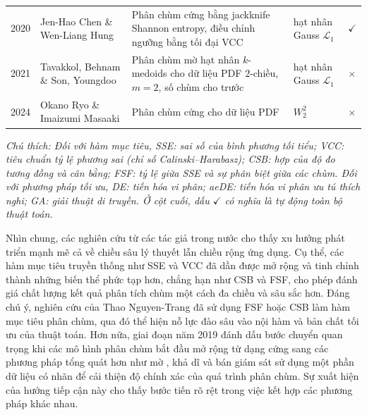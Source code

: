 \documentclass[a4paper,oneside]{book} %
\theoremstyle{plain}
\theoremstyle{plain}
\theoremstyle{nonumberplain}
\begin{document}
\begin{table}
\begin{tabular*}{\textwidth}{@{\extracolsep\fill}lp{3cm}p{5.5cm}p{3cm}p{2cm}@{\extracolsep\fill}}
		\midrule
				2020 & Jen-Hao Chen \& Wen-Liang Hung \cite{chen2021jackknife} & Phân chùm cứng bằng jackknife Shannon entropy, điều chỉnh ngưỡng bằng tối đại VCC& hạt nhân Gauss $\mathcal{L}_1$ & $\checkmark$\\
		2021 & Tavakkol, Behnam \& Son, Youngdoo \cite{tavakkol2021fuzzy} & Phân chùm mờ hạt nhân $k$-medoids cho dữ liệu PDF $2$-chiều, $m=2$, số chùm cho trước& hạt nhân Gauss $\mathcal{L}_1$& $\times$   \\
		2024 & Okano Ryo \& Imaizumi Masaaki \cite{okano2024wasserstein} & Phân chùm cứng cho dữ liệu PDF &$W^2_2$ &$\times$   \\
		\bottomrule
	\end{tabular*}
	\label{tab:in_clustering_summary}
\begin{minipage}{\textwidth}
			\fontsize{11pt}{14pt}\selectfont\it
	Chú thích:	Đối với hàm mục tiêu, SSE: sai số của bình phương tối tiểu; VCC: tiêu chuẩn tỷ lệ phương sai (chỉ số Calinski--Harabasz); CSB: hợp của độ đo tương đồng và cân bằng; FSF: tỷ lệ giữa SSE và sự phân biệt giữa các chùm. Đối với phương pháp tối ưu, DE:  tiến hóa vi phân; aeDE: tiến hóa vi phân ưu tú thích nghi; GA: giải thuật di truyền. Ở cột cuối, dấu $\checkmark$ có nghĩa là tự động toàn bộ thuật toán.
\end{minipage}
\end{table}

Nhìn chung, các nghiên cứu từ các tác giả trong nước cho thấy xu hướng phát triển mạnh mẽ cả về chiều sâu lý thuyết lẫn chiều rộng ứng dụng. Cụ thể, các hàm mục tiêu truyền thống như SSE và VCC đã dần được mở rộng và tinh chỉnh thành những biến thể phức tạp hơn, chẳng hạn như CSB và FSF, cho phép đánh giá chất lượng kết quả phân tích chùm một cách đa chiều và sâu sắc hơn. Đáng chú ý, nghiên cứu của Thao Nguyen-Trang đã sử dụng FSF \cite{nguyen2023globally} hoặc CSB \cite{nguyen2023balance} làm hàm mục tiêu phân chùm, qua đó thể hiện nỗ lực đào sâu vào nội hàm và bản chất tối ưu của thuật toán.
Hơn nữa, giai đoạn năm 2019 đánh dấu bước chuyển quan trọng khi các mô hình phân chùm bắt đầu mở rộng từ dạng cứng \cite{pham2019new} sang các phương pháp tổng quát hơn như mờ \cite{phamtoan2022automatic}, khả dĩ \cite{tran2024new} và bán giám sát \cite{nguyen2024new} sử dụng một phần dữ liệu có nhãn để cải thiện độ chính xác của quá trình phân chùm. Sự xuất hiện của hướng tiếp cận này cho thấy bước tiến rõ rệt trong việc kết hợp các phương pháp khác nhau.
\end{document}
